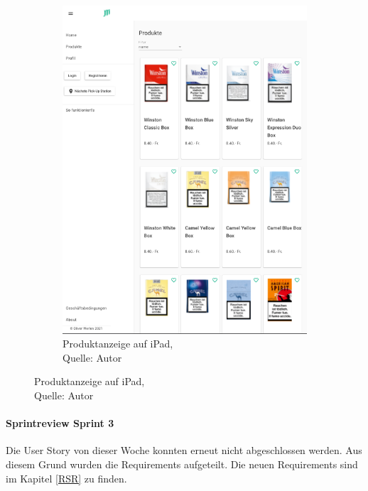 \begin{figure}[H]
\begin{subfigure}[b]{0.45\textwidth}
		\includegraphics[scale=0.3]{images/productsTablet.PNG}
		\caption[Produktanzeige auf iPad]{Produktanzeige auf iPad, \\Quelle: Autor}
		\label{img: Products iPad}
	\end{subfigure}
\end{figure} 

\paragraph{Sprintreview Sprint 3}
Die \gls{User Story} von dieser Woche konnten erneut nicht abgeschlossen werden. Aus diesem Grund wurden die Requirements aufgeteilt. Die neuen Requirements sind im Kapitel \ref{RSR} zu finden. 
\newpage
